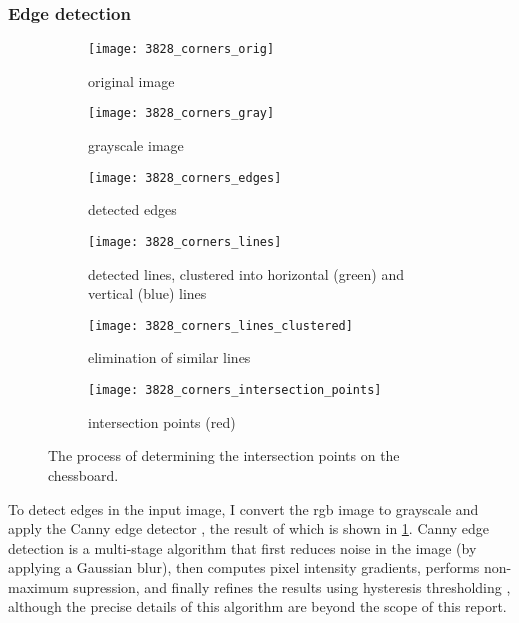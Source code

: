 \documentclass[../report.tex]{subfiles}
\begin{document}
\subsubsection{Edge detection}
\begin{figure}
    \centering
    \begin{subfigure}[t]{0.47\textwidth}
        \centering
        \texttt{[image: 3828\_corners\_orig]}
        \caption{original image}
    \end{subfigure}
    \hfill
    \begin{subfigure}[t]{0.47\textwidth}
        \centering
        \texttt{[image: 3828\_corners\_gray]}
        \caption{grayscale image}
    \end{subfigure}
    \bigskip
    \begin{subfigure}[t]{0.47\textwidth}
        \centering
        \texttt{[image: 3828\_corners\_edges]}
        \caption{detected edges}
        \label{fig:board_localisation_line_detection_edges}
    \end{subfigure}
    \hfill
    \begin{subfigure}[t]{0.47\textwidth}
        \centering
        \texttt{[image: 3828\_corners\_lines]}
        \caption{detected lines, clustered into horizontal (green) and vertical (blue) lines}
        \label{fig:board_localisation_line_detection_horizontal_vertical}
    \end{subfigure}
    \bigskip
    \begin{subfigure}[t]{0.47\textwidth}
        \centering
        \texttt{[image: 3828\_corners\_lines\_clustered]}
        \caption{elimination of similar lines}
        \label{fig:board_localisation_line_detection_elimination}
    \end{subfigure}
    \hfill
    \begin{subfigure}[t]{0.47\textwidth}
        \centering
        \texttt{[image: 3828\_corners\_intersection\_points]}
        \caption{intersection points (red)}
        \label{fig:board_localisation_line_detection_intersections}
    \end{subfigure}
    \caption{The process of determining the intersection points on the chessboard.}
    \label{fig:board_localisation_line_detection}
\end{figure}
To detect edges in the input image, I convert the \gls{rgb} image to grayscale and apply the Canny edge detector \cite{canny1986}, the result of which is shown in \cref{fig:board_localisation_line_detection_edges}.
Canny edge detection is a multi-stage algorithm that first reduces noise in the image (by applying a Gaussian blur), then computes pixel intensity gradients, performs non-maximum supression, and finally refines the results using hysteresis thresholding \cite{canny1986}, although the precise details of this algorithm are beyond the scope of this report.
\end{document}
